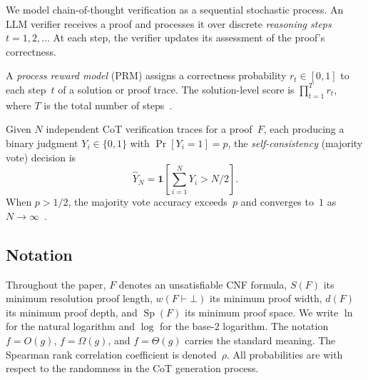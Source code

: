 We model chain-of-thought verification as a sequential stochastic process.  An
LLM verifier receives a proof and processes it over discrete \emph{reasoning
steps} $t = 1, 2, \ldots$  At each step, the verifier updates its assessment
of the proof's correctness.

\begin{definition}\label{def:prm}
A \emph{process reward model} (PRM) assigns a correctness probability
$r_t \in [0,1]$ to each step~$t$ of a solution or proof trace.  The
solution-level score is $\prod_{t=1}^T r_t$, where $T$ is the total number of
steps~\cite{lightman2023lets}.
\end{definition}

\begin{definition}\label{def:self-consistency}
Given $N$ independent CoT verification traces for a proof~$F$, each
producing a binary judgment $Y_i \in \{0,1\}$ with
$\Pr[Y_i = 1] = p$, the \emph{self-consistency} (majority vote) decision is
\[
\hat{Y}_N = \mathbf{1}\!\left[\sum_{i=1}^N Y_i > N/2\right].
\]
When $p > 1/2$, the majority vote accuracy exceeds~$p$ and converges to~$1$ as
$N \to \infty$~\cite{wang2022self}.
\end{definition}

\subsection{Notation}\label{sec:notation}

Throughout the paper, $F$ denotes an unsatisfiable CNF formula, $S(F)$ its
minimum resolution proof length, $w(F \vdash \bot)$ its minimum proof width,
$d(F)$ its minimum proof depth, and $\operatorname{Sp}(F)$ its minimum proof
space.  We write $\ln$ for the natural logarithm and $\log$ for the base-$2$
logarithm.  The notation $f = O(g)$, $f = \Omega(g)$, and $f = \Theta(g)$
carries the standard meaning.  The Spearman rank correlation coefficient is
denoted~$\rho$.  All probabilities are with respect to the randomness in the
CoT generation process.
